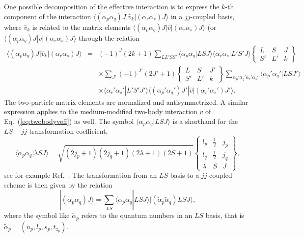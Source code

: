 \documentclass[preprint,12pt,authoryear]{elsarticle}
\begin{document}
One possible decomposition of the effective interaction is to
express the $k$-th component of the interaction $\langle
(\alpha_p\alpha_q)J|\hat{v}_{k}|(\alpha_r\alpha_s)J\rangle $ in a $jj$-coupled basis, where
$\hat{v}_k$ is related to the matrix
elements $\langle (\alpha_p\alpha_q)J|\hat{v}|(\alpha_r\alpha_s)J\rangle $ (or $\langle (\alpha_p\alpha_q)J|\tilde{v}|(\alpha_r\alpha_s)J\rangle $ 
through the relation
\begin{eqnarray}
\langle (\alpha_p\alpha_q)J|\hat{v}_{k}|(\alpha_r\alpha_s)J\rangle&=&(-1)^{J}(2k+1)
\sum_{LL'SS'}\langle
\alpha_p\alpha_q|LSJ\rangle \langle \alpha_r\alpha_s|L'S'J\rangle
\left\{ \begin{array}{ccc}
		       L&S&J\\
		       S'&L'&k
		       \end{array}
		 \right\} \nonumber \\
& &\times \sum_{J'}(-1)^{J'}(2J'+1)\left\{ \begin{array}{ccc}
		       L&S&J'\\
		       S'&L'&k
		       \end{array}
		 \right\}
\sum_{\alpha_{p}'\alpha_{q}'\alpha_{r}'\alpha_{s}'}\langle \alpha_p'\alpha_q'|LSJ'\rangle
\nonumber\\
& &\times \langle \alpha_r'\alpha_s'|L'S'J'\rangle \langle
(\alpha_p'\alpha_q')J'|\hat{v}|(\alpha_r'\alpha_s')J'\rangle .  \label{eq:jj}
\end{eqnarray}
The two-particle matrix elements are normalized and antisymmetrized.
A similar expression applies to the medium-modified two-body interaction $\tilde{v}$ of 
Eq.~(\ref{eq:twobodyveff}) as well.
The symbol $\langle \alpha_p\alpha_q|LSJ \rangle $ is a shorthand
for the $LS-jj$ transformation coefficient,
\[
\langle \alpha_p\alpha_q|\lambda SJ \rangle = \sqrt{(2j_{p}+1)(2j_{q}+1)(2\lambda+1)(2S+1)}
\left\{
\begin{array}{ccc}
       l_{p}&\frac{1}{2}&j_{p}\\
       l_{q}&\frac{1}{2}&j_{q}\\
       \lambda    &S          &J
\end{array}
\right\},
\]
see for example Ref.~\cite{lawson1980}. 
The transformation from an $LS$ basis to a $jj$-coupled scheme is then given by the relation
\[
|(\alpha_p\alpha_q)J\rangle  = \sum_{LS}\langle \alpha_p\alpha_q|LSJ \rangle |(\tilde{\alpha}_p\tilde{\alpha}_q)LSJ\rangle,
\] 
where the symbol like $\tilde{\alpha}_{p}$ refers to the quantum numbers in an $LS$ basis, that is
$\tilde{\alpha}_{p}=(n_{p},l_{p},s_{p},t_{z_{p}})$.
\end{document}
